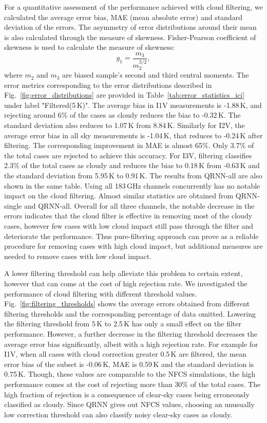 \documentclass[amt, manuscript]{copernicus}
\begin{document}
For a quantitative assessment of the performance achieved with cloud filtering, we calculated the average error bias, MAE (mean absolute error) and standard deviation of the errors. The asymmetry of error distributions around their mean is also calculated through the measure of skewness. Fisher-Pearson coefficient of skewness is used to calculate the measure of skewness: 
\begin{equation}
g_1 = \frac{m_3}{m_2^{3/2}}, 
\end{equation}
where $m_2$ and $m_3$ are biased sample's second and third central moments. The error metrics corresponding to the error distributions described in Fig.~\ref{fig:error_distributions} are provided in Table~\ref{tab:error_statistics_ici} under label "Filtered(5\,K)". The average bias in I1V measurements is -1.88\,K, and rejecting around 6\% of the cases as cloudy reduces the bias to -0.32\,K. The standard deviation also reduces to 1.07\,K from 8.84\,K. Similarly for I2V, the average error bias in all sky measurements is -1.04\,K, that reduces to -0.24\,K after filtering. The corresponding improvement in MAE is almost 65\%. Only 3.7\% of the total cases are rejected to achieve this accuracy. For I3V, filtering classifies 2.3\% of the total cases as cloudy and reduces the bias to 0.18\,K from -0.63\,K and the standard deviation from 5.95\,K to 0.91\,K. The results from QRNN-all are also shown in the same table. Using all 183\,GHz channels concurrently has no notable impact on the cloud filtering. Almost similar statistics are obtained from QRNN-single and QRNN-all. Overall for all three channels, the notable decrease in the errors indicates that the cloud filter is effective in removing most of the cloudy cases, however few cases with low cloud impact still pass through the filter and deteriorate the performance. Thus pure-filtering approach can prove as a reliable procedure for removing cases with high cloud impact, but additional measures are needed to remove cases with low cloud impact.

A lower filtering threshold can help alleviate this problem to certain extent, however that can come at the cost of high rejection rate. We investigated the performance of cloud filtering with different threshold values. Fig.~\ref{fig:filtering_thresholds} shows the average errors obtained from different filtering thresholds and the corresponding percentage of data omitted. Lowering the filtering threshold from 5\,K to 2.5\,K has only a small effect on the filter performance. However, a further decrease in the filtering threshold decreases the average error bias significantly, albeit with a high rejection rate. For example for I1V, when all cases with cloud correction greater 0.5\,K are filtered, the mean error bias of the subset is -0.06\,K, MAE is 0.59\,K and the standard deviation is 0.75\,K. Though, these values are comparable to the NFCS simulations, the high performance comes at the cost of rejecting more than 30\% of the total cases. The high fraction of rejection is a consequence of clear-sky cases being erroneously classified as cloudy. Since QRNN gives out NFCS values, choosing an unusually low correction threshold can also classify noisy clear-sky cases as cloudy. 
\end{document}
